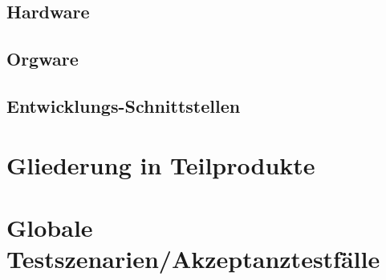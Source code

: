 \documentclass[12pt, a4paper]{article}
\begin{document}
\subsection{Hardware}
\subsection{Orgware}
\subsection{Entwicklungs-Schnittstellen}
\pagebreak

\section{Gliederung in Teilprodukte}
\pagebreak

\section{Globale Testszenarien/Akzeptanztestfälle}
\end{document}
